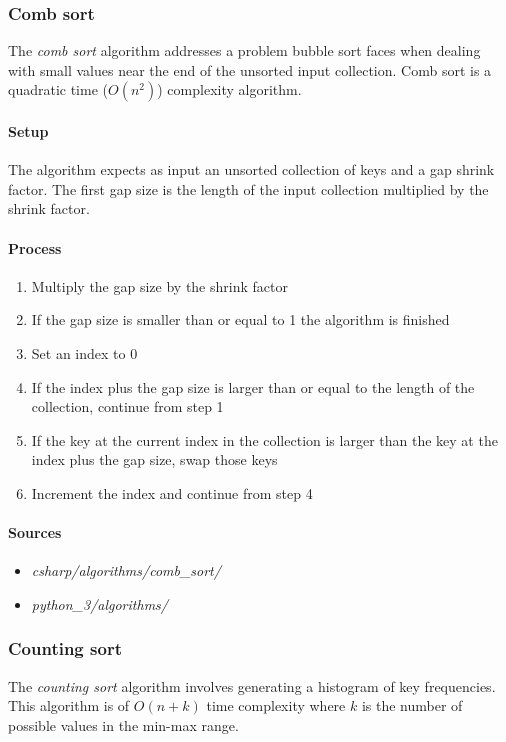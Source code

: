\documentclass{article}
\begin{document}
\subsubsection{Comb sort}
The {\em comb sort} algorithm addresses a problem bubble sort faces when dealing with small values near the end of
the unsorted input collection. Comb sort is a quadratic time (\(O(n^2)\)) complexity algorithm.

\paragraph{Setup}
The algorithm expects as input an unsorted collection of keys and a gap shrink factor. The first gap size is the
length of the input collection multiplied by the shrink factor.

\paragraph{Process}
\begin{enumerate}
\item{Multiply the gap size by the shrink factor}
\item{If the gap size is smaller than or equal to 1 the algorithm is finished}
\item{Set an index to 0}
\item{If the index plus the gap size is larger than or equal to the length of the collection, continue from step 1}
\item{If the key at the current index in the collection is larger than the key at the index plus the gap size,
  swap those keys}
\item{Increment the index and continue from step 4}
\end{enumerate}

\begin{samepage}
  \paragraph{Sources}
  \begin{itemize}
  \item{{\em csharp/algorithms/comb\_sort/}}
  \item{{\em python\_3/algorithms/}}
  \end{itemize}
\end{samepage}


\subsubsection{Counting sort}
The {\em counting sort} algorithm involves generating a histogram of key frequencies. This algorithm is of
\(O(n+k)\) time complexity where \(k\) is the number of possible values in the min-max range.
\end{document}
